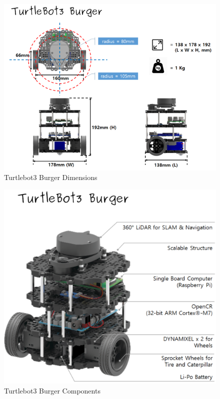 \begin{figure}[!ht]
\centering
\includegraphics[width=\linewidth]{images/basics/turtlebot3_dimension1.png}
\caption{Turtlebot3 Burger Dimensions \autocite{emanual-turtlebot3-comp}}
\label{fig:turtlebot-dimensions}
\end{figure}

\begin{figure}[!ht]
\centering
\includegraphics[width=\linewidth]{images/basics/turtlebot3_burger_components.png}
\caption{Turtlebot3 Burger Components \autocite{emanual-turtlebot3-comp}}
\label{fig:turtlebot-components}
\end{figure}

